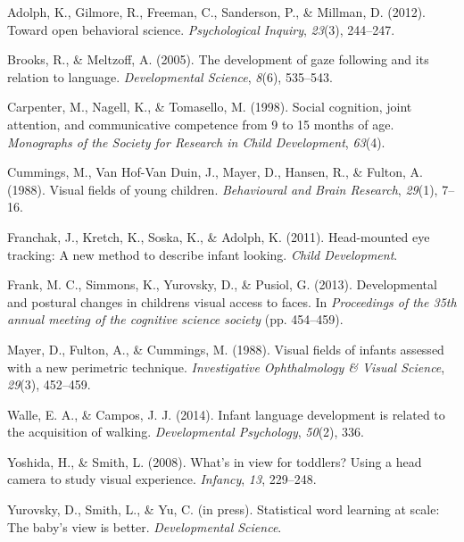\documentclass[10pt, letterpaper]{article}
\begin{document}
\hypertarget{ref-adolph2012}{}
Adolph, K., Gilmore, R., Freeman, C., Sanderson, P., \& Millman, D.
(2012). Toward open behavioral science. \emph{Psychological Inquiry},
\emph{23}(3), 244--247.

\hypertarget{ref-brooks2005}{}
Brooks, R., \& Meltzoff, A. (2005). The development of gaze following
and its relation to language. \emph{Developmental Science}, \emph{8}(6),
535--543.

\hypertarget{ref-carpenter1998}{}
Carpenter, M., Nagell, K., \& Tomasello, M. (1998). Social cognition,
joint attention, and communicative competence from 9 to 15 months of
age. \emph{Monographs of the Society for Research in Child Development},
\emph{63}(4).

\hypertarget{ref-cummings1988}{}
Cummings, M., Van Hof-Van Duin, J., Mayer, D., Hansen, R., \& Fulton, A.
(1988). Visual fields of young children. \emph{Behavioural and Brain
Research}, \emph{29}(1), 7--16.

\hypertarget{ref-franchak2011}{}
Franchak, J., Kretch, K., Soska, K., \& Adolph, K. (2011). Head-mounted
eye tracking: A new method to describe infant looking. \emph{Child
Development}.

\hypertarget{ref-frank2013}{}
Frank, M. C., Simmons, K., Yurovsky, D., \& Pusiol, G. (2013).
Developmental and postural changes in childrens visual access to faces.
In \emph{Proceedings of the 35th annual meeting of the cognitive science
society} (pp. 454--459).

\hypertarget{ref-mayer1988}{}
Mayer, D., Fulton, A., \& Cummings, M. (1988). Visual fields of infants
assessed with a new perimetric technique. \emph{Investigative
Ophthalmology \& Visual Science}, \emph{29}(3), 452--459.

\hypertarget{ref-walle2014}{}
Walle, E. A., \& Campos, J. J. (2014). Infant language development is
related to the acquisition of walking. \emph{Developmental Psychology},
\emph{50}(2), 336.

\hypertarget{ref-yoshida2008}{}
Yoshida, H., \& Smith, L. (2008). What's in view for toddlers? Using a
head camera to study visual experience. \emph{Infancy}, \emph{13},
229--248.

\hypertarget{ref-yurovsky2012}{}
Yurovsky, D., Smith, L., \& Yu, C. (in press). Statistical word learning
at scale: The baby's view is better. \emph{Developmental Science}.
\end{document}
